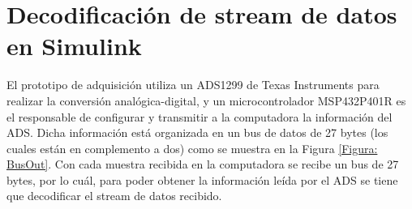

%

\section{Decodificación de stream de datos en Simulink}
El prototipo de adquisición utiliza un ADS1299 de Texas Instruments para realizar la conversión analógica-digital, y un microcontrolador MSP432P401R es el responsable de configurar y transmitir a la computadora la información del ADS. Dicha información está organizada en un bus de datos de 27 bytes (los cuales están en complemento a dos) como se muestra en la Figura \ref{Figura: BusOut}. Con cada muestra recibida en la computadora se recibe un bus de 27 bytes, por lo cuál, para poder obtener la información leída por el ADS se tiene que decodificar el stream de datos recibido.

